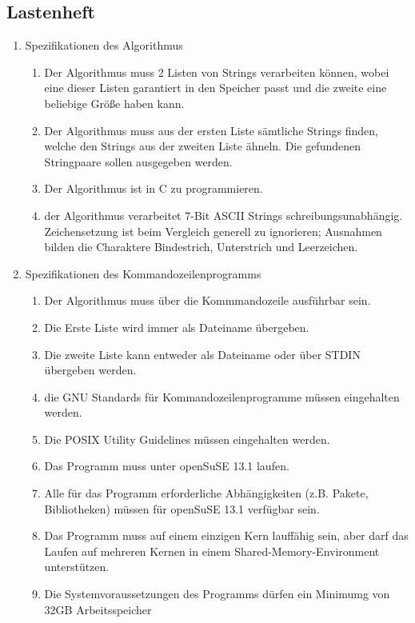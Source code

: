 \subsection{Lastenheft}
\label{auszug:lastenheft}
\renewcommand{\labelenumii}{\theenumii}
\renewcommand{\theenumii}{\theenumi.\arabic{enumii}.}
\begin{enumerate}
	\item Spezifikationen des Algorithmus
	\begin{enumerate}
		\item Der Algorithmus muss 2 Listen von Strings verarbeiten können,
		wobei eine dieser Listen garantiert in den Speicher passt und die zweite
		eine beliebige Größe haben kann.
		\item Der Algorithmus muss aus der ersten Liste sämtliche Strings finden,
		welche den Strings aus der zweiten Liste ähneln. Die gefundenen Stringpaare
		sollen ausgegeben werden.
		\item Der Algorithmus ist in C zu programmieren.
		\item der Algorithmus verarbeitet 7-Bit ASCII Strings schreibungsunabhängig. Zeichensetzung
		ist beim Vergleich generell zu ignorieren; Ausnahmen bilden die
		Charaktere Bindestrich, Unterstrich und Leerzeichen.
	\end{enumerate}
	\item Spezifikationen des Kommandozeilenprogramms
	\begin{enumerate}
		\item Der Algorithmus muss über die Kommmandozeile ausführbar sein.
		\item Die Erste Liste wird immer als Dateiname übergeben.
		\item Die zweite Liste kann entweder als Dateiname oder über STDIN übergeben werden.
		\item die GNU Standards für Kommandozeilenprogramme müssen eingehalten werden.
		\item Die POSIX Utility Guidelines müssen eingehalten werden.
		\item Das Programm muss unter openSuSE 13.1 laufen.
		\item Alle für das Programm erforderliche Abhängigkeiten
		(z.B. Pakete, Bibliotheken) müssen für openSuSE 13.1 verfügbar sein.
		\item Das Programm muss auf einem einzigen Kern lauffähig sein, aber
		darf das Laufen auf mehreren Kernen in einem Shared-Memory-Environment
		unterstützen.
		\item Die Systemvoraussetzungen des Programms dürfen ein Minimumg von 32GB Arbeitsspeicher

\end{enumerate}
\end{enumerate}
